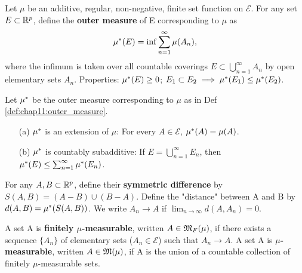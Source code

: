 
\begin{definition}
  \label{def:chap11:outer_measure}
  Let $\mu$ be an additive, regular, non-negative, finite set
  function on $\mathcal{E}$. For any set $E \subset \mathbb{R}^p$, define the
  \textbf{outer measure} of E corresponding to $\mu$ as
  \[
    \mu^*(E) = \inf \sum_{n=1}^\infty \mu(A_n),
  \]
  where the infimum is taken over all countable coverings $E \subset
  \bigcup_{n=1}^\infty A_n$ by open elementary sets $A_n$.
  Properties: $\mu^*(E) \ge 0$; $E_1 \subset E_2 \implies
  \mu^*(E_1) \le \mu^*(E_2)$.
\end{definition}

\begin{theorem}
  \label{thm:chap11:outer_measure_properties}
  Let $\mu^*$ be the outer measure corresponding to $\mu$ as in Def
  \ref{def:chap11:outer_measure}.
  \begin{itemize}
    \item[(a)] $\mu^*$ is an extension of $\mu$: For every $A \in
      \mathcal{E}$, $\mu^*(A) = \mu(A)$.
    \item[(b)] $\mu^*$ is countably subadditive: If $E =
      \bigcup_{n=1}^\infty E_n$, then $\mu^*(E) \le
      \sum_{n=1}^\infty \mu^*(E_n)$.
  \end{itemize}
\end{theorem}



\begin{definition}
  \label{def:chap11:measurable_sets}
  For any $A, B \subset \mathbb{R}^p$, define their \textbf{symmetric
  difference} by $S(A, B) = (A - B) \cup (B - A)$.
  Define the "distance" between A and B by $d(A, B) = \mu^*(S(A, B))$.
  We write $A_n \to A$ if $\lim_{n\to\infty} d(A, A_n) = 0$.

  A set A is \textbf{finitely $\mu$-measurable}, written $A \in
  \mathfrak{M}_F(\mu)$, if there exists a sequence $\{ A_n \}$ of
  elementary sets ($A_n \in \mathcal{E}$) such that $A_n \to A$.
  A set A is \textbf{$\mu$-measurable}, written $A \in
  \mathfrak{M}(\mu)$, if A is the union of a countable collection of
  finitely $\mu$-measurable sets.
\end{definition}

